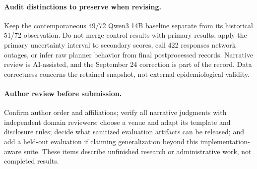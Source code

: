 \documentclass[10pt,twocolumn,letterpaper]{article}
\begin{document}
\paragraph{Audit distinctions to preserve when revising.}
Keep the contemporaneous 49/72 Qwen3 14B baseline separate from its historical 51/72 observation. Do not merge control results with primary results, apply the primary uncertainty interval to secondary scores, call 422 responses network outages, or infer raw planner behavior from final postprocessed records. Narrative review is AI-assisted, and the September 24 correction is part of the record. Data correctness concerns the retained snapshot, not external epidemiological validity.

\paragraph{Author review before submission.}
Confirm author order and affiliations; verify all narrative judgments with independent domain reviewers; choose a venue and adapt its template and disclosure rules; decide what sanitized evaluation artifacts can be released; and add a held-out evaluation if claiming generalization beyond this implementation-aware suite. These items describe unfinished research or administrative work, not completed results.
\end{document}
